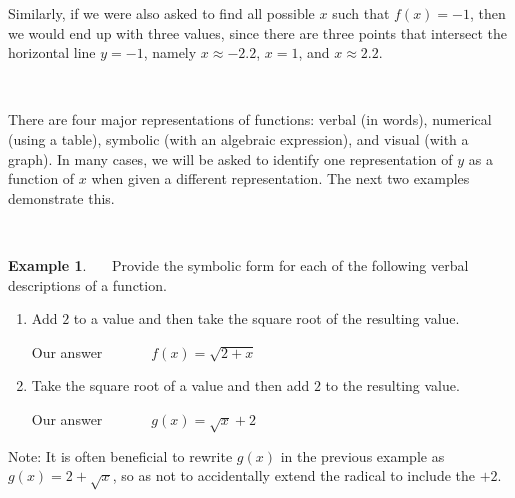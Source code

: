 \documentclass[11pt]{book}
\theoremstyle{definition}  %
\newtheorem{example}{Example}[chapter]
\newcommand{\pp}{\par~\par}
\begin{document}
Similarly, if we were also asked to find all possible $x$ such that $f(x)=-1$, then we would end up with three values, since there are three points that intersect the horizontal line $y=-1$, namely $x\approx -2.2$, $x=1$, and $x\approx 2.2$.\pp

There are four major representations of functions: verbal (in words), numerical (using a table), symbolic (with an algebraic expression), and visual (with a graph).  %
In many cases, we will be asked to identify one representation of $y$ as a function of $x$ when given a different representation.  The next two examples demonstrate this.\pp

\begin{example}~~~Provide the symbolic form for each of the following verbal descriptions of a function.
\begin{enumerate}
	\item Add $2$ to a value and then take the square root of the resulting value. 
\begin{center}
Our answer~~~~~~~$f(x)=\sqrt{2+x}$
\end{center}
	\item Take the square root of a value and then add $2$ to the resulting value.
\begin{center}
Our answer~~~~~~~$g(x)=\sqrt{x}+2$
\end{center}
\end{enumerate}
\end{example}
Note: It is often beneficial to rewrite $g(x)$ in the previous example as $g(x)=2+\sqrt{x}$, so as not to accidentally extend the radical to include the $+2$.
\newpage
\end{document}
